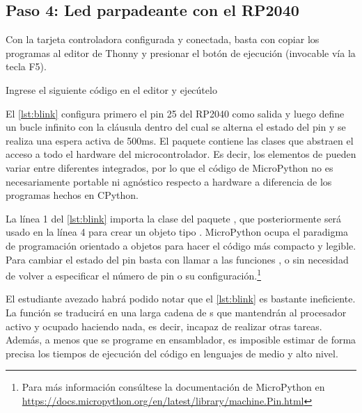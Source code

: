 %
%



\subsection{Paso 4: Led parpadeante con el RP2040}%
\label{sec:step4}

Con la tarjeta controladora configurada y conectada, basta con copiar los programas al editor de Thonny y presionar el botón de ejecución (invocable vía la tecla F5).

\medskip{}

\noindent
Ingrese el siguiente código en el editor y ejecútelo




El \cref{lst:blink} configura primero el pin 25 del RP2040 como salida y luego define un bucle infinito con la cláusula  dentro del cual se alterna el estado del pin y se realiza una espera activa de 500ms.
El paquete  contiene las clases que abstraen el acceso a todo el hardware del microcontrolador.
Es decir, los elementos de  pueden variar entre diferentes integrados, por lo que el código de MicroPython no es necesariamente portable ni agnóstico respecto a hardware a diferencia de los programas hechos en CPython.

La línea 1 del \cref{lst:blink} importa la clase  del paquete , que posteriormente será usado en la línea 4 para crear un objeto tipo .
MicroPython ocupa el paradigma de programación orientado a objetos para hacer el código más compacto y legible.
Para cambiar el estado del pin basta con llamar a las funciones ,  o  sin necesidad de volver a especificar el número de pin o su configuración.\footnote{Para más información consúltese la documentación de MicroPython en \url{https://docs.micropython.org/en/latest/library/machine.Pin.html}}

El estudiante avezado habrá podido notar que el \cref{lst:blink} es bastante ineficiente.
La función  se traducirá en una larga cadena de s que mantendrán al procesador activo y ocupado haciendo nada, es decir, incapaz de realizar otras tareas.
Además, a menos que se programe en ensamblador, es imposible estimar de forma precisa los tiempos de ejecución del código en lenguajes de medio y alto nivel.

